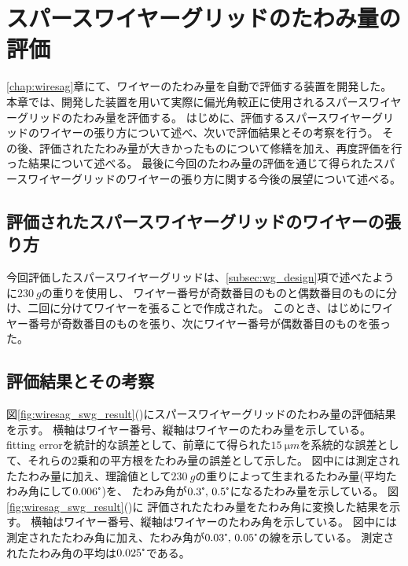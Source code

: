 \documentclass[../../main.tex]{subfiles}
\begin{document}
\chapter{スパースワイヤーグリッドのたわみ量の評価}
\label{chap:wiresag_swg}
\ref{chap:wiresag}章にて、ワイヤーのたわみ量を自動で評価する装置を開発した。
本章では、開発した装置を用いて実際に偏光角較正に使用されるスパースワイヤーグリッドのたわみ量を評価する。
はじめに、評価するスパースワイヤーグリッドのワイヤーの張り方について述べ、次いで評価結果とその考察を行う。
その後、評価されたたわみ量が大きかったものについて修繕を加え、再度評価を行った結果について述べる。
最後に今回のたわみ量の評価を通じて得られたスパースワイヤーグリッドのワイヤーの張り方に関する今後の展望について述べる。

\section{評価されたスパースワイヤーグリッドのワイヤーの張り方}
今回評価したスパースワイヤーグリッドは、\ref{subsec:wg_design}項で述べたように$\SI{230}{g}$の重りを使用し、
ワイヤー番号が奇数番目のものと偶数番目のものに分け、二回に分けてワイヤーを張ることで作成された。
このとき、はじめにワイヤー番号が奇数番目のものを張り、次にワイヤー番号が偶数番目のものを張った。

\section{評価結果とその考察}
図\ref{fig:wiresag_swg_result}()にスパースワイヤーグリッドのたわみ量の評価結果を示す。
横軸はワイヤー番号、縦軸はワイヤーのたわみ量を示している。
fitting errorを統計的な誤差として、前章にて得られた$\SI{15}{\micro m}$を系統的な誤差として、それらの2乗和の平方根をたわみ量の誤差として示した。
図中には測定されたたわみ量に加え、理論値として$\SI{230}{g}$の重りによって生まれるたわみ量(平均たわみ角にして$0.006\tcdegree$)を、
たわみ角が$0.3\tcdegree,\,0.5\tcdegree$になるたわみ量を示している。
図\ref{fig:wiresag_swg_result}()に
評価されたたわみ量をたわみ角に変換した結果を示す。
横軸はワイヤー番号、縦軸はワイヤーのたわみ角を示している。
図中には測定されたたわみ角に加え、たわみ角が$0.03\tcdegree,\,0.05\tcdegree$の線を示している。
測定されたたわみ角の平均は$0.025\tcdegree$である。
\end{document}
